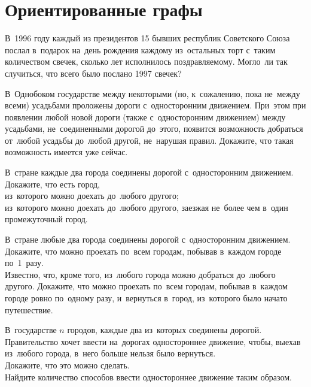 

\section*{Ориентированные графы}


\begin{problems}

\item
В~1996 году каждый из президентов 15 бывших республик Советского Союза послал
в~подарок на~день рождения каждому из~остальных торт с~таким количеством
свечек, сколько лет исполнилось поздравляемому.
Могло~ли так случиться, что всего было послано 1997 свечек?

\item
В~Однобоком государстве между некоторыми (но, к~сожалению, пока не~между всеми)
усадьбами проложены дороги с~односторонним движением.
При~этом при появлении любой новой дороги (также с~односторонним движением)
между усадьбами, не~соединенными дорогой до~этого, появится возможность
добраться от~любой усадьбы до~любой другой, не~нарушая правил.
Докажите, что такая возможность имеется уже сейчас.

\item
В~стране каждые два города соединены дорогой с~односторонним движением.
Докажите, что есть город,
\\
\sbp
из~которого можно доехать до~любого другого;
\\
\sbp
из~которого можно доехать до~любого другого, заезжая не~более чем в~один
промежуточный город.

\item
В~стране любые два города соединены дорогой с~односторонним движением.
\\
\sbp
Докажите, что можно проехать по~всем городам, побывав в~каждом городе
по~1~разу.
\\
\sbp
Известно, что, кроме того, из~любого города можно добраться до~любого другого.
Докажите, что можно проехать по~всем городам, побывав в~каждом городе ровно
по~одному разу, и~вернуться в~город, из~которого было начато путешествие.

\item
В~государстве $n$ городов, каждые два из~которых соединены дорогой.
Правительство хочет ввести на~дорогах одностороннее движение, чтобы, выехав
из~любого города, в~него больше нельзя было вернуться.
\\
\sbp
Докажите, что это можно сделать.
\\
\sbp
Найдите количество способов ввести одностороннее движение таким образом.


\end{problems}
